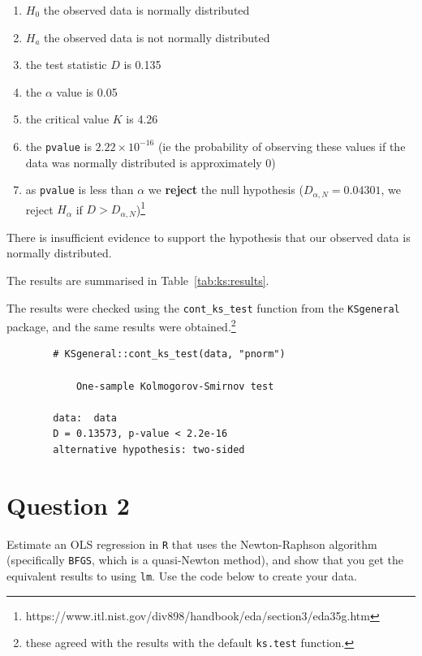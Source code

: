 \documentclass[12pt,letterpaper]{article}
\begin{document}
	\begin{enumerate}
		\item $H_0$ the observed data is normally distributed
		\item $H_a$ the observed data is not normally distributed
		\item the test statistic $D$ is 0.135
		\item the $\alpha$ value is 0.05
		\item the critical value $K$ is 4.26
		\item the \texttt{pvalue} is $2.22 \times 10^{-16}$ (ie the probability of observing these values if the data was normally distributed is approximately 0)
		\item as \texttt{pvalue} is less than $\alpha$ we \textbf{reject} the null hypothesis
		($D_{\alpha,N}=0.04301$, we reject $H_\alpha$ if $D > D_{\alpha,N}$)\footnote{https://www.itl.nist.gov/div898/handbook/eda/section3/eda35g.htm}
	\end{enumerate}

	There is insufficient evidence to support the hypothesis that our observed data is normally distributed.

  The results are summarised in Table~\ref{tab:ks:results}.

	The results were checked using the \texttt{cont\_ks\_test} function from the \texttt{KSgeneral} package, and the same results were obtained.\footnote{these agreed with the results with the default \texttt{ks.test} function.}
  \begin{lstlisting}
		# KSgeneral::cont_ks_test(data, "pnorm")

			One-sample Kolmogorov-Smirnov test

		data:  data
		D = 0.13573, p-value < 2.2e-16
		alternative hypothesis: two-sided
\end{lstlisting}

%  
	\clearpage


\section*{Question 2}
\noindent Estimate an OLS regression in \texttt{R} that uses the Newton-Raphson algorithm (specifically \texttt{BFGS}, which is a quasi-Newton method), and show that you get the equivalent results to using \texttt{lm}. Use the code below to create your data.
\end{document}
